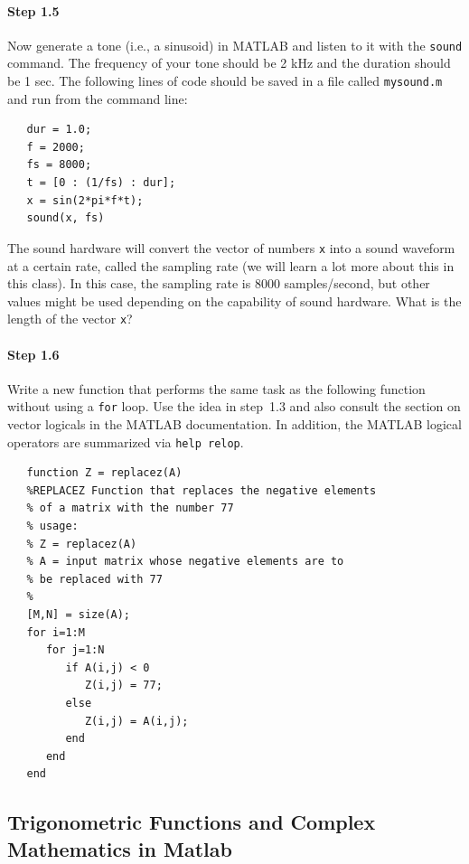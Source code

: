 \paragraph{Step 1.5} Now generate a tone (i.e., a sinusoid) in MATLAB
and listen to it with the \texttt{sound} command. The frequency of
your tone should be 2 kHz and the duration should be 1 sec. The
following lines of code should be saved in a file called
\texttt{mysound.m} and run from the command line:
\begin{verbatim}
   dur = 1.0;
   f = 2000;
   fs = 8000;
   t = [0 : (1/fs) : dur];
   x = sin(2*pi*f*t);
   sound(x, fs)
\end{verbatim}
The sound hardware will convert the vector of numbers \texttt{x} into
a sound waveform at a certain rate, called the sampling rate (we will
learn a lot more about this in this class). In this case, the sampling
rate is 8000 samples/second, but other values might be used depending
on the capability of sound hardware. What is the length of the vector
\texttt{x}?

\paragraph{Step 1.6} Write a new function that performs the same task
as the following function without using a \texttt{for} loop. Use the
idea in step~1.3 and also consult the section on vector logicals in
the MATLAB documentation. In addition, the MATLAB logical operators
are summarized via \texttt{help relop}.
\begin{verbatim}
   function Z = replacez(A)
   %REPLACEZ Function that replaces the negative elements
   % of a matrix with the number 77
   % usage:
   % Z = replacez(A)
   % A = input matrix whose negative elements are to
   % be replaced with 77
   %
   [M,N] = size(A);
   for i=1:M
      for j=1:N
         if A(i,j) < 0
            Z(i,j) = 77;
         else
            Z(i,j) = A(i,j);
         end
      end
   end
\end{verbatim}


\subsection{Trigonometric Functions and Complex Mathematics in Matlab}


